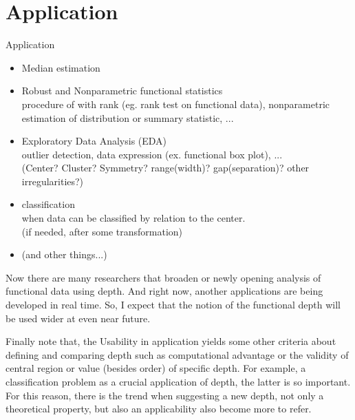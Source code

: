 \documentclass[aspectratio=169,ignorenonframetext,9pt]{beamer}
\theoremstyle{plain}
\theoremstyle{definition}
\begin{document}
\section{Application}
\begin{frame}{Application}
\begin{itemize}
    \item Median estimation
    \item Robust and Nonparametric functional statistics \\
    procedure of with rank (eg. rank test on functional data), nonparametric estimation of distribution or summary statistic, ...
    \item Exploratory Data Analysis (EDA) \\
    outlier detection, data expression (ex. functional box plot), ...\\
    (Center? Cluster? Symmetry? range(width)? gap(separation)? other irregularities?)
    \item classification \\
    when data can be classified by relation to the center. \\
    (if needed, after some transformation)
    \item (and other things...)
\end{itemize}

Now there are many researchers that broaden or newly opening analysis of functional data using depth.
And right now, another applications are being developed in real time.
So, I expect that the notion of the functional depth will be used wider at even near future.

Finally note that, the Usability in application yields some other criteria about defining and comparing depth
such as computational advantage or the validity of central region or value (besides order) of specific depth.
For example, a classification problem as a crucial application of depth, the latter is so important.
For this reason, there is the trend when suggesting a new depth, not only a theoretical property, 
but also an applicability also become more to refer.

\end{frame}
\end{document}
